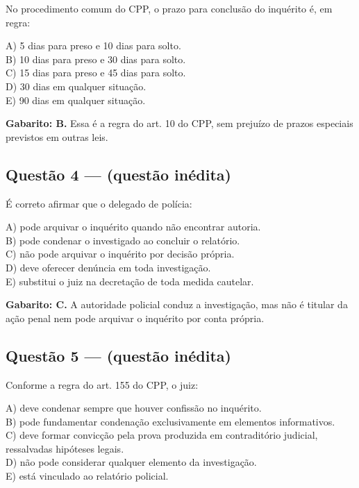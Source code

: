 \documentclass[11pt,a4paper]{article}
\begin{document}
No procedimento comum do CPP, o prazo para conclusão do inquérito é, em regra:

A) 5 dias para preso e 10 dias para solto. \\ B) 10 dias para preso e 30 dias para solto. \\ C) 15 dias para preso e 45 dias para solto. \\ D) 30 dias em qualquer situação. \\ E) 90 dias em qualquer situação.

\begin{alerta}
\textbf{Gabarito: B.} Essa é a regra do art. 10 do CPP, sem prejuízo de prazos especiais previstos em outras leis.
\end{alerta}

\subsection*{Questão 4 — (questão inédita)}

É correto afirmar que o delegado de polícia:

A) pode arquivar o inquérito quando não encontrar autoria. \\ B) pode condenar o investigado ao concluir o relatório. \\ C) não pode arquivar o inquérito por decisão própria. \\ D) deve oferecer denúncia em toda investigação. \\ E) substitui o juiz na decretação de toda medida cautelar.

\begin{alerta}
\textbf{Gabarito: C.} A autoridade policial conduz a investigação, mas não é titular da ação penal nem pode arquivar o inquérito por conta própria.
\end{alerta}

\subsection*{Questão 5 — (questão inédita)}

Conforme a regra do art. 155 do CPP, o juiz:

A) deve condenar sempre que houver confissão no inquérito. \\ B) pode fundamentar condenação exclusivamente em elementos informativos. \\ C) deve formar convicção pela prova produzida em contraditório judicial, ressalvadas hipóteses legais. \\ D) não pode considerar qualquer elemento da investigação. \\ E) está vinculado ao relatório policial.
\end{document}
